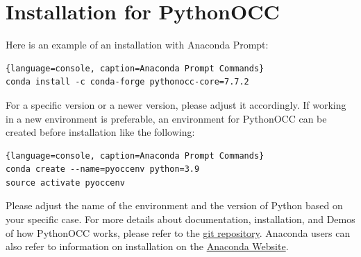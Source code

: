 \documentclass[12pt, a4paper]{report}
\begin{document}
\section{Installation for PythonOCC}
Here is an example\cite{pythonocc} of an installation with Anaconda Prompt:
\vspace{12pt}
\begin{lstlisting}{language=console, caption=Anaconda Prompt Commands}
conda install -c conda-forge pythonocc-core=7.7.2
\end{lstlisting}
For a specific version or a newer version, please adjust it accordingly.
If working in a new environment is preferable, an environment for PythonOCC can be created before installation like the following: 
\vspace{12pt}
\begin{lstlisting}{language=console, caption=Anaconda Prompt Commands}
conda create --name=pyoccenv python=3.9
source activate pyoccenv
\end{lstlisting}
Please adjust the name of the environment and the version of Python based on your specific case.
For more details about documentation, installation, and Demos of how PythonOCC works, please refer to the \href{https://github.com/tpaviot/pythonocc-core}{git repository}\cite{pythonocc}. Anaconda users can also refer to information on installation on the \href{https://anaconda.org/conda-forge/pythonocc-core}{Anaconda Website}.
 
\setlength{\parskip}{12pt}
\end{document}
